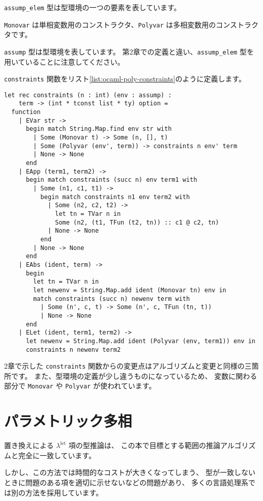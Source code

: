 \texttt{assump\_elem} 型は型環境の一つの要素を表しています。

\texttt{Monovar} は単相変数用のコンストラクタ、\texttt{Polyvar} は多相変数用のコンストラクタです。

\texttt{assump} 型は型環境を表しています。
第2章での定義と違い、\texttt{assump\_elem} 型を用いていることに注意してください。

\texttt{constraints} 関数をリスト\ref{list:ocaml-poly-constraints}のように定義します。

\begin{lstlisting}[caption=制約の生成, label=list:ocaml-poly-constraints]
let rec constraints (n : int) (env : assump) :
    term -> (int * tconst list * ty) option =
  function
    | EVar str ->
      begin match String.Map.find env str with
        | Some (Monovar t) -> Some (n, [], t)
        | Some (Polyvar (env', term)) -> constraints n env' term
        | None -> None
      end
    | EApp (term1, term2) ->
      begin match constraints (succ n) env term1 with
        | Some (n1, c1, t1) ->
          begin match constraints n1 env term2 with
            | Some (n2, c2, t2) ->
              let tn = TVar n in
              Some (n2, (t1, TFun (t2, tn)) :: c1 @ c2, tn)
            | None -> None
          end
        | None -> None
      end
    | EAbs (ident, term) ->
      begin
        let tn = TVar n in
        let newenv = String.Map.add ident (Monovar tn) env in
        match constraints (succ n) newenv term with
          | Some (n', c, t) -> Some (n', c, TFun (tn, t))
          | None -> None
      end
    | ELet (ident, term1, term2) ->
      let newenv = String.Map.add ident (Polyvar (env, term1)) env in
      constraints n newenv term2
\end{lstlisting}

2章で示した \texttt{constraints} 関数からの変更点はアルゴリズムと変更と同様の三箇所です。
また、型環境の定義が少し違うものになっているため、
変数に関わる部分で \texttt{Monovar} や \texttt{Polyvar} が使われています。

\section{パラメトリック多相}

置き換えによる $\lambda^\mathrm{let}$ 項の型推論は、
この本で目標とする範囲の推論アルゴリズムと完全に一致しています。

しかし、この方法では時間的なコストが大きくなってしまう、
型が一致しないときに問題のある項を適切に示せないなどの問題があり、
多くの言語処理系では別の方法を採用しています。


